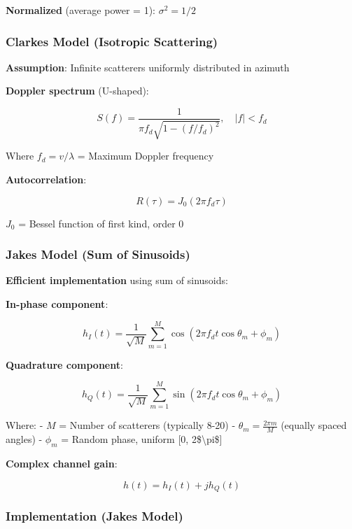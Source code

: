 \textbf{Normalized} (average power = 1): \(\sigma^2 = 1/2\)


\subsubsection{Clarke\textquotesingle s Model (Isotropic
Scattering)}\label{clarkes-model-isotropic-scattering}

\textbf{Assumption}: Infinite scatterers uniformly distributed in
azimuth

\textbf{Doppler spectrum} (U-shaped):

\[
S(f) = \frac{1}{\pi f_d \sqrt{1 - (f/f_d)^2}}, \quad |f| < f_d
\]

Where \(f_d = v/\lambda\) = Maximum Doppler frequency

\textbf{Autocorrelation}:

\[
R(\tau) = J_0(2\pi f_d \tau)
\]

\(J_0\) = Bessel function of first kind, order 0


\subsubsection{Jakes\textquotesingle{} Model (Sum of
Sinusoids)}\label{jakes-model-sum-of-sinusoids}

\textbf{Efficient implementation} using sum of sinusoids:

\textbf{In-phase component}:

\[
h_I(t) = \frac{1}{\sqrt{M}} \sum_{m=1}^{M} \cos(2\pi f_d t \cos\theta_m + \phi_m)
\]

\textbf{Quadrature component}:

\[
h_Q(t) = \frac{1}{\sqrt{M}} \sum_{m=1}^{M} \sin(2\pi f_d t \cos\theta_m + \phi_m)
\]

Where: - \(M\) = Number of scatterers (typically 8-20) -
\(\theta_m = \frac{2\pi m}{M}\) (equally spaced angles) - \(\phi_m\) =
Random phase, uniform {[}0, 2\$\textbackslash pi\${]}

\textbf{Complex channel gain}:

\[
h(t) = h_I(t) + j h_Q(t)
\]


\subsubsection{Implementation (Jakes\textquotesingle{}
Model)}\label{implementation-jakes-model}

